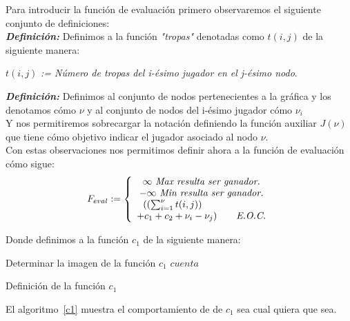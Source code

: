 \documentclass[12pt,twocolumn,draft]{article}
\begin{document}
Para introducir la funci\'on de evaluaci\'on primero observaremos el siguiente conjunto de definiciones:\\

\textbf{\textit{Definici\'on:}}
Definimos a la funci\'on  \textit{"tropas"} denotadas como 
$t(i,j)$ de la siguiente manera:
\begin{center}
$t(i,j)$ \textit{:= N\'umero de tropas del i-\'esimo  jugador en el j-\'esimo nodo}.\\
\end{center}

\textbf{\textit{Definici\'on:}}
Definimos al conjunto de nodos pertenecientes a la gr\'afica y los denotamos c\'omo $\nu$ y al conjunto de nodos del i-\'esimo jugador c\'omo $\nu_{i}$\\

Y nos permitiremos sobrecargar la notaci\'on definiendo la funci\'on auxiliar $J(\nu)$ que tiene c\'omo objetivo indicar el jugador asociado al nodo $\nu$.\\


Con estas observaciones nos permitimos definir ahora a la funci\'on de evaluaci\'on c\'omo sigue:\\

$$ 
F_{eval}:= \left\{\begin{array}{c l}
  \infty\ \textit{Max\ resulta\ ser\ ganador.}\\
  -\infty\ \textit{Min\ resulta\ ser\ ganador.}\\
  ((\sum_{i=1}^{\nu} t(i,j)) \qquad \qquad \qquad\\
  +c_{1}+c_{2}+\nu_{i}-\nu_{j}) \qquad \textit{E.O.C.}
\end{array}
\right.
$$

Donde definimos a la funci\'on $c_{1}$ de la siguiente manera:

\begin{algorithm}
\begin{algorithmic}[1]
\ENSURE Determinar la imagen de la funci\'on $c_{1}$
\ENDIF
\ENDFOR
{}
\ELSE
{}
\ENDIF
\ENDFOR
\RETURN $cuenta$

\end{algorithmic}
\caption{Definici\'on de la funci\'on $c_{1}$}
\label{c1}
\end{algorithm}

El algoritmo~\ref{c1} muestra el comportamiento de de $c_{1}$ sea cual quiera que sea.\\
\end{document}
